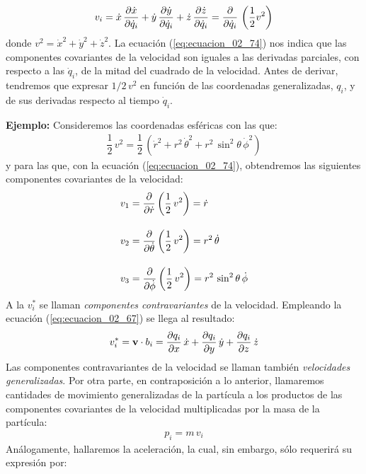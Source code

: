 \begin{align}
    v_{i} = \dot{x} \, \pdv{\dot{x}}{\dot{q}_{i}} + \dot{y} \, \pdv{\dot{y}}{\dot{q}_{i}} + \dot{z} \, \pdv{\dot{z}}{\dot{q}_{i}} = \pdv{\dot{q}_{i}} \, \left( \dfrac{1}{2} v^{2} \right)
    \label{eq:ecuacion_02_74}
\end{align}
donde $v^{2} = \dot{x}^{2} + \dot{y}^{2} + \dot{z}^{2}$. La ecuación (\ref{eq:ecuacion_02_74}) nos indica que las componentes covariantes de la velocidad son iguales a las derivadas parciales, con respecto a las $\dot{q}_{i}$, de la mitad del cuadrado de la velocidad. Antes de derivar, tendremos que expresar $1/2 \, v^{2}$ en función de las coordenadas generalizadas, $q_{i}$, y de sus derivadas respecto al tiempo $\dot{q}_{i}$. 
\par
\noindent
\textbf{Ejemplo: } Consideremos las coordenadas esféricas con las que:
\begin{align*}
    \dfrac{1}{2} \, v^{2} = \dfrac{1}{2} \, \left( \dot{r}^{2} + r^{2} \, \dot{\theta}^{2} + r^{2} \, \sin^{2} \theta \, \dot{\phi}^{2} \right)
\end{align*}
y para las que, con la ecuación (\ref{eq:ecuacion_02_74}), obtendremos las siguientes componentes covariantes de la velocidad:
\begin{align*}
    v_{1} &= \pdv{\dot{r}} \left( \dfrac{1}{2} \, v^{2} \right) = \dot{r} \\[1em]
    v_{2} &= \pdv{\dot{\theta}} \left( \dfrac{1}{2} \, v^{2} \right) = r^{2} \, \dot{\theta} \\[1em]
    v_{3} &= \pdv{\dot{\phi}} \left( \dfrac{1}{2} \, v^{2} \right) = r^{2} \, \sin^{2} \theta \, \dot{\phi}
\end{align*}
A la $v_{i}^{*}$ se llaman \emph{componentes contravariantes} de la velocidad. Empleando la ecuación (\ref{eq:ecuacion_02_67}) se llega al resultado:
\begin{align}
    v_{i}^{*} = \vb{v} \cdot b_{i} = \pdv{q_{i}}{x} \, \dot{x} + \pdv{q_{i}}{y} \, \dot{y} + \pdv{q_{i}}{z} \, \dot{z}
    \label{eq:ecuacion_02_75}
\end{align} 
Las componentes contravariantes de la velocidad se llaman también \emph{velocidades generalizadas}. Por otra parte, en contraposición a lo anterior, llamaremos cantidades de movimiento generalizadas de la partícula a los productos de las componentes covariantes de la velocidad multiplicadas por la masa de la partícula:
\begin{align*}
    p_{i} = m \, v_{i}
\end{align*} 
Análogamente, hallaremos la aceleración, la cual, sin embargo, sólo requerirá su expresión por:
